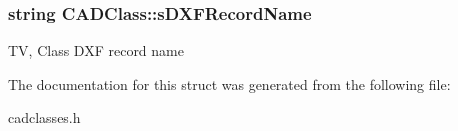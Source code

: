 \subsubsection[{\texorpdfstring{s\+D\+X\+F\+Record\+Name}{sDXFRecordName}}]{\setlength{\rightskip}{0pt plus 5cm}string C\+A\+D\+Class\+::s\+D\+X\+F\+Record\+Name}\hypertarget{struct_c_a_d_class_a17535310e9f4855ac640f04f037a3e63}{}\label{struct_c_a_d_class_a17535310e9f4855ac640f04f037a3e63}
TV, Class D\+XF record name 

The documentation for this struct was generated from the following file\+:\begin{DoxyCompactItemize}
\item 
cadclasses.\+h\end{DoxyCompactItemize}
